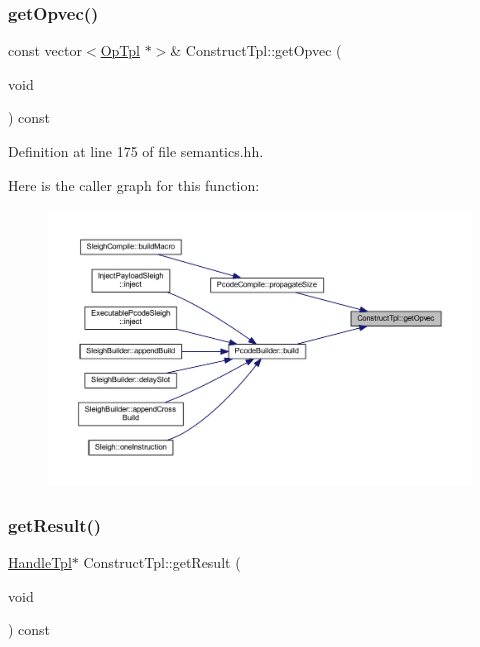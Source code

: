 \subsubsection{\texorpdfstring{getOpvec()}{getOpvec()}}
{\footnotesize\ttfamily const vector$<$\mbox{\hyperlink{class_op_tpl}{Op\+Tpl}} $\ast$$>$\& Construct\+Tpl\+::get\+Opvec (\begin{DoxyParamCaption}\item[{void}]{ }\end{DoxyParamCaption}) const\hspace{0.3cm}{\ttfamily [inline]}}



Definition at line 175 of file semantics.\+hh.

Here is the caller graph for this function\+:
\nopagebreak
\begin{figure}[H]
\begin{center}
\leavevmode
\includegraphics[width=350pt]{class_construct_tpl_acc7cf7bb955ba28c5e93c11e56fbd0ae_icgraph}
\end{center}
\end{figure}
\mbox{\label{class_construct_tpl_a1d7e73bdea2a98c688276a87fc18f614}} 
\subsubsection{\texorpdfstring{getResult()}{getResult()}}
{\footnotesize\ttfamily \mbox{\hyperlink{class_handle_tpl}{Handle\+Tpl}}$\ast$ Construct\+Tpl\+::get\+Result (\begin{DoxyParamCaption}\item[{void}]{ }\end{DoxyParamCaption}) const\hspace{0.3cm}{\ttfamily [inline]}}



